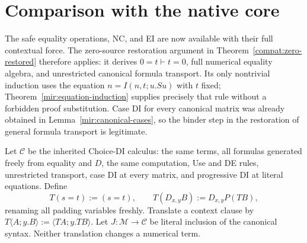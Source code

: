 \section{Comparison with the native core}
\label{mir:comparison}


The safe equality operations, NC, and EI are now available with their
full contextual force. The zero-source restoration argument in
Theorem~\ref{compat:zero-restored} therefore applies: it derives
$0=t\vdash t=0$, full numerical equality algebra, and unrestricted
canonical formula transport. Its only nontrivial induction uses the
equation $n=I(n,t;u.Su)$ with $t$ fixed; Theorem~\ref{mir:equation-induction}
supplies precisely that rule without a forbidden proof substitution.
Case DI for every canonical matrix was already obtained in
Lemma~\ref{mir:canonical-cases}, so the binder step in the restoration
of general formula transport is legitimate.

Let $\mathcal C$ be the inherited Choice-DI calculus: the same terms,
all formulas generated freely from equality and $D$, the same
computation, Use and DE rules, unrestricted transport, case DI at
every matrix, and progressive DI at literal equations. Define
\[
 T(s=t):=(s=t),\qquad
 T(D_{x,y}B):=D_{x,y}P(TB),
 \tag{Translation}\label{mir:translation}
\]
renaming all padding variables freshly. Translate a context clause by
$T\langle A;y.B\rangle:=\langle TA;y.TB\rangle$. Let
$J:\mathcal M\to\mathcal C$ be literal inclusion of the canonical
syntax. Neither translation changes a numerical term.

